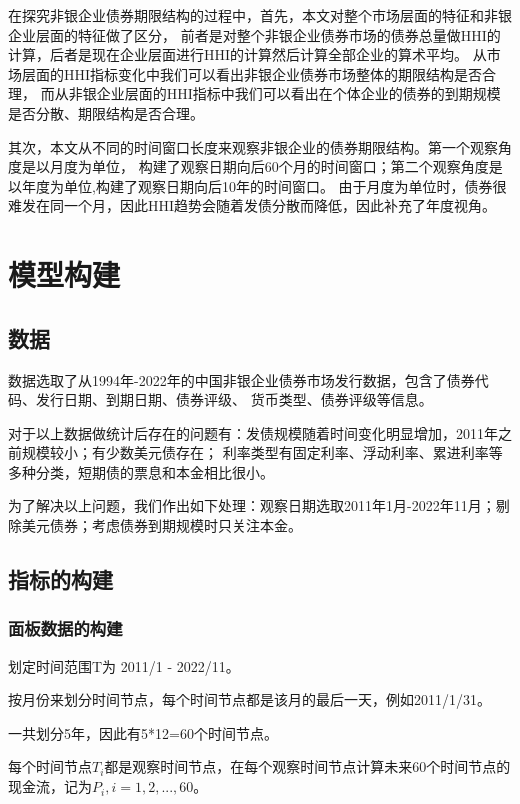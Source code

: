 \documentclass[a4paper,12pt]{report}
\begin{document}
    在探究非银企业债券期限结构的过程中，首先，本文对整个市场层面的特征和非银企业层面的特征做了区分，
    前者是对整个非银企业债券市场的债券总量做HHI的计算，后者是现在企业层面进行HHI的计算然后计算全部企业的算术平均。
    从市场层面的HHI指标变化中我们可以看出非银企业债券市场整体的期限结构是否合理，
    而从非银企业层面的HHI指标中我们可以看出在个体企业的债券的到期规模是否分散、期限结构是否合理。

    其次，本文从不同的时间窗口长度来观察非银企业的债券期限结构。第一个观察角度是以月度为单位，
    构建了观察日期向后60个月的时间窗口；第二个观察角度是以年度为单位,构建了观察日期向后10年的时间窗口。
    由于月度为单位时，债券很难发在同一个月，因此HHI趋势会随着发债分散而降低，因此补充了年度视角。

    \chapter{模型构建}

    \section{数据}
    数据选取了从1994年-2022年的中国非银企业债券市场发行数据，包含了债券代码、发行日期、到期日期、债券评级、
    货币类型、债券评级等信息。

    对于以上数据做统计后存在的问题有：发债规模随着时间变化明显增加，2011年之前规模较小；有少数美元债存在；
    利率类型有固定利率、浮动利率、累进利率等多种分类，短期债的票息和本金相比很小。

    为了解决以上问题，我们作出如下处理：观察日期选取2011年1月-2022年11月；剔除美元债券；考虑债券到期规模时只关注本金。

    \section{指标的构建}
    \subsection{面板数据的构建}
    
    划定时间范围T为 2011/1 - 2022/11。

    按月份来划分时间节点，每个时间节点都是该月的最后一天，例如2011/1/31。

    一共划分5年，因此有5*12=60个时间节点。

    每个时间节点$T_i$都是观察时间节点，在每个观察时间节点计算未来60个时间节点的现金流，记为$P_i, i=1,2,...,60$。
\end{document}
